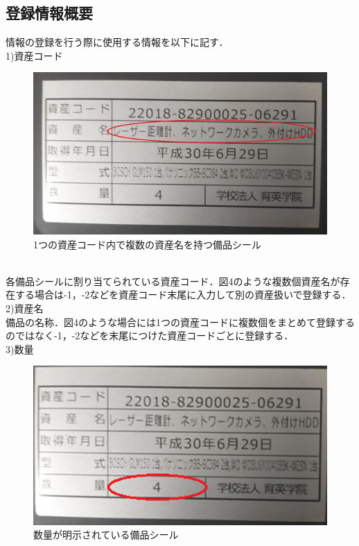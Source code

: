 \documentclass[11pt,a4j]{jarticle}
\begin{document}
  \subsection{登録情報概要}
  情報の登録を行う際に使用する情報を以下に記す．
  \\1)資産コード
  \begin{figure}[h]
  \begin{center}
\includegraphics[keepaspectratio, scale=0.45]{jouhoutouroku1}
\caption{1つの資産コード内で複数の資産名を持つ備品シール}
\end{center}
\end{figure}
\\各備品シールに割り当てられている資産コード．図4のような複数個資産名が存在する場合は-1，-2などを資産コード末尾に入力して別の資産扱いで登録する．
\\2)資産名
\\備品の名称．図4のような場合には1つの資産コードに複数個をまとめて登録するのではなく-1，-2などを末尾につけた資産コードごとに登録する．
\\3)数量
  \begin{figure}[h]
  \begin{center}
\includegraphics[keepaspectratio, scale=0.45]{jouhoutouroku3}
\caption{数量が明示されている備品シール}
\end{center}
\end{figure}
\end{document}
